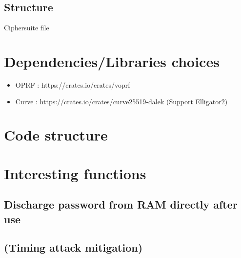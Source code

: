 \documentclass[../report.tex]{subfiles}
\begin{document}
\subsection{Structure}
Ciphersuite
file

\section{Dependencies/Libraries choices}
\begin{itemize}
 \item OPRF : https://crates.io/crates/voprf
 \item Curve : https://crates.io/crates/curve25519-dalek (Support Elligator2)
\end{itemize}

\section{Code structure}
\section{Interesting functions}
\subsection{Discharge password from RAM directly after use}
\subsection{(Timing attack mitigation)}
\end{document}
